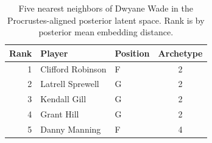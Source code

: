 \begin{table}[htbp]
  \centering\small
  \begin{tabular}{rllc}
    \toprule
    Rank & Player & Position & Archetype \\
    \midrule
    1 & Clifford Robinson & F & 2 \\
    2 & Latrell Sprewell & G & 2 \\
    3 & Kendall Gill & G & 2 \\
    4 & Grant Hill & G & 2 \\
    5 & Danny Manning & F & 4 \\
    \bottomrule
  \end{tabular}
  \caption{Five nearest neighbors of Dwyane Wade in the Procrustes-aligned posterior latent space. Rank is by posterior mean embedding distance.}
  \label{tab:Dwyane_Wade_neighbors}
\end{table}

